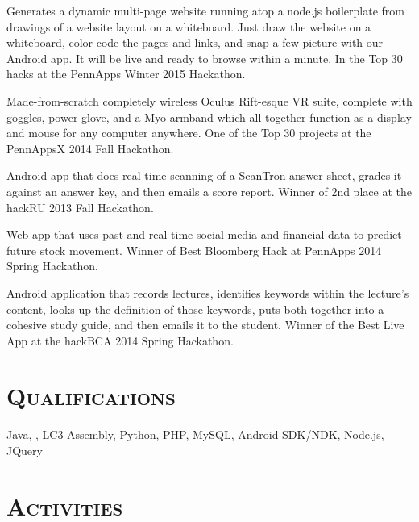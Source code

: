 \begin{resume}
\begin{position}
Generates a dynamic multi-page website running atop a node.js boilerplate from drawings of a website layout on a whiteboard. Just draw the website on a whiteboard, color-code the pages and links, and snap a few picture with our Android app. It will be live and ready to browse within a minute. In the Top 30 hacks at the PennApps Winter 2015 Hackathon.
\end{position}

\begin{position}
Made-from-scratch completely wireless Oculus Rift-esque VR suite, complete with goggles, power glove, and a Myo armband which all together function as a display and mouse for any computer anywhere. One of the Top 30 projects at the PennAppsX 2014 Fall Hackathon.
\end{position}

\begin{position}
Android app that does real-time scanning of a ScanTron answer sheet, grades it against an answer key, and then emails a score report. Winner of 2nd place at the hackRU 2013 Fall Hackathon.
\end{position}

\begin{position}
Web app that uses past and real-time social media and financial data to predict future stock movement. Winner of Best Bloomberg Hack at PennApps 2014 Spring Hackathon.
\end{position}

\begin{position}
Android application that records lectures, identifies keywords within the lecture's content, looks up the definition of those keywords, puts both together into a cohesive study guide, and then emails it to the student. Winner of the Best Live App at the hackBCA 2014 Spring Hackathon. 
\end{position}

\section{\textsc{Qualifications}}
Java, \Cplusplus, LC3 Assembly, Python, PHP, MySQL, Android SDK/NDK, Node.js, JQuery
\section{\textsc{Activities}}


\end{resume}
